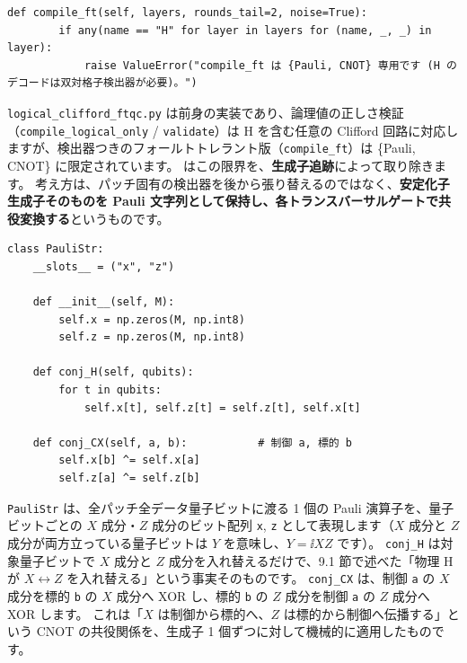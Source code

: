 \begin{lstlisting}[caption={H を含む回路のフォールトトレラント版を拒否するガード（src/stages/01\_mpp/src/ftqc/logical\_clifford\_ftqc.py）}]
    def compile_ft(self, layers, rounds_tail=2, noise=True):
        if any(name == "H" for layer in layers for (name, _, _) in layer):
            raise ValueError("compile_ft は {Pauli, CNOT} 専用です (H のデコードは双対格子検出器が必要)。")
\end{lstlisting}

\texttt{logical\_clifford\_ftqc.py} は前身の実装であり、論理値の正しさ検証（\texttt{compile\_logical\_only} / \texttt{validate}）は H を含む任意の Clifford 回路に対応しますが、検出器つきのフォールトトレラント版（\texttt{compile\_ft}）は \{Pauli, CNOT\} に限定されています。
 はこの限界を、\textbf{生成子追跡}によって取り除きます。
考え方は、パッチ固有の検出器を後から張り替えるのではなく、\textbf{安定化子生成子そのものを Pauli 文字列として保持し、各トランスバーサルゲートで共役変換する}というものです。

\begin{lstlisting}[caption={生成子を表す Pauli 文字列とその共役変換（src/stages/01\_mpp/src/ftqc/clifford\_ft\_full.py）}]
class PauliStr:
    __slots__ = ("x", "z")

    def __init__(self, M):
        self.x = np.zeros(M, np.int8)
        self.z = np.zeros(M, np.int8)

    def conj_H(self, qubits):
        for t in qubits:
            self.x[t], self.z[t] = self.z[t], self.x[t]

    def conj_CX(self, a, b):           # 制御 a, 標的 b
        self.x[b] ^= self.x[a]
        self.z[a] ^= self.z[b]
\end{lstlisting}

\texttt{PauliStr} は、全パッチ全データ量子ビットに渡る 1 個の Pauli 演算子を、量子ビットごとの $X$ 成分・$Z$ 成分のビット配列 \texttt{x}, \texttt{z} として表現します（$X$ 成分と $Z$ 成分が両方立っている量子ビットは $Y$ を意味し、$Y=\ii XZ$ です）。
\texttt{conj\_H} は対象量子ビットで $X$ 成分と $Z$ 成分を入れ替えるだけで、9.1 節で述べた「物理 H が $X\leftrightarrow Z$ を入れ替える」という事実そのものです。
\texttt{conj\_CX} は、制御 \texttt{a} の $X$ 成分を標的 \texttt{b} の $X$ 成分へ XOR し、標的 \texttt{b} の $Z$ 成分を制御 \texttt{a} の $Z$ 成分へ XOR します。
これは「$X$ は制御から標的へ、$Z$ は標的から制御へ伝播する」という CNOT の共役関係を、生成子 1 個ずつに対して機械的に適用したものです。


